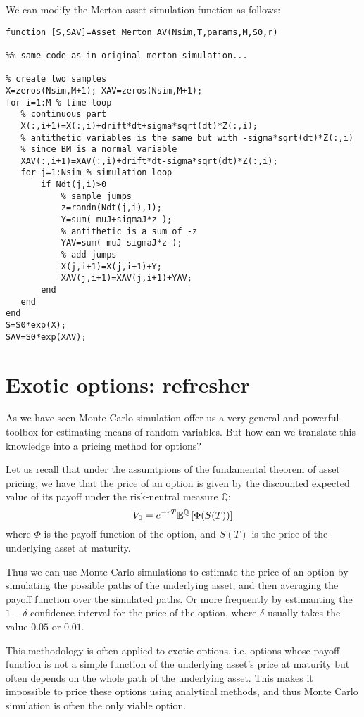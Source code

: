 We can modify the Merton asset simulation function as follows:

\begin{verbatim}
function [S,SAV]=Asset_Merton_AV(Nsim,T,params,M,S0,r)

%% same code as in original merton simulation...

% create two samples
X=zeros(Nsim,M+1); XAV=zeros(Nsim,M+1);
for i=1:M % time loop
   % continuous part
   X(:,i+1)=X(:,i)+drift*dt+sigma*sqrt(dt)*Z(:,i);
   % antithetic variables is the same but with -sigma*sqrt(dt)*Z(:,i)
   % since BM is a normal variable
   XAV(:,i+1)=XAV(:,i)+drift*dt-sigma*sqrt(dt)*Z(:,i);
   for j=1:Nsim % simulation loop
       if Ndt(j,i)>0
           % sample jumps
           z=randn(Ndt(j,i),1);
           Y=sum( muJ+sigmaJ*z );
           % antithetic is a sum of -z
           YAV=sum( muJ-sigmaJ*z );
           % add jumps
           X(j,i+1)=X(j,i+1)+Y;
           XAV(j,i+1)=XAV(j,i+1)+YAV;
       end
   end
end
S=S0*exp(X);
SAV=S0*exp(XAV);
\end{verbatim}

\section{Exotic options: refresher}
As we have seen Monte Carlo simulation offer us a very general and powerful
toolbox for estimating means of random variables. But how can we translate this
knowledge into a pricing method for options?

Let us recall that under the assumtpions of the fundamental theorem of asset
pricing, we have that the price of an option is given by the discounted
expected value of its payoff under the risk-neutral measure $\mathbb{Q}$:
\[ V_0 = e^{-rT} \mathbb{E}^{\mathbb{Q}} \left[ \Phi(S(T)) \right]\]
where $\Phi$ is the payoff function of the option, and $S(T)$ is the price of
the underlying asset at maturity.

Thus we can use Monte Carlo simulations to estimate the price of an option by
simulating the possible paths of the underlying asset, and then averaging the
payoff function over the simulated paths. Or more frequently by estimanting
the $1-\delta$ confidence interval for the price of the option, where $\delta$
usually takes the value $0.05$ or $0.01$.

This methodology is often applied to exotic options, i.e. options whose payoff
function is not a simple function of the underlying asset's price at maturity
but often depends on the whole path of the underlying asset. This makes it
impossible to price these options using analytical methods, and thus Monte
Carlo simulation is often the only viable option.

